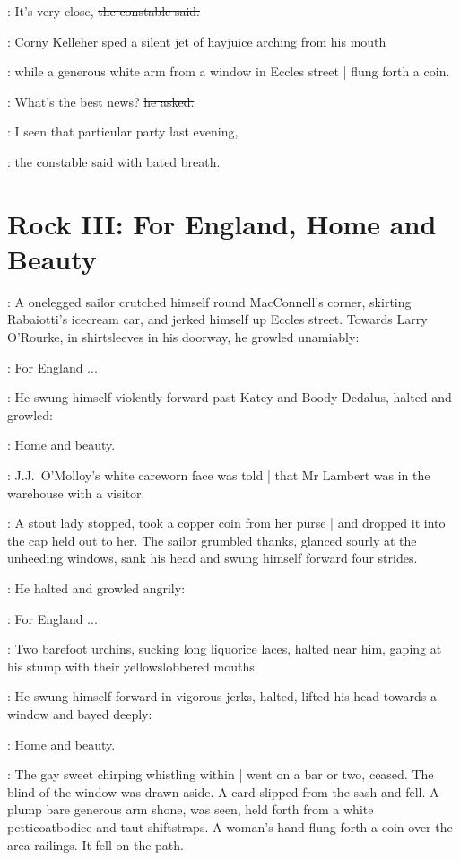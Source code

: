 \constable:
It's very close,
\sout{the constable said.}

:
Corny Kelleher sped a silent jet of hayjuice arching from his mouth

:
while a generous white arm from a window in Eccles street |
flung forth a coin.

\corny:
What's the best news? \sout{he asked.}

\constable:
I seen that particular party last evening,

:
the constable said with bated breath.


\section*{Rock III: For England, Home and Beauty}

:
A onelegged sailor crutched himself round MacConnell's corner,
skirting Rabaiotti's icecream car,
and jerked himself up Eccles street.
Towards Larry O'Rourke,
in shirtsleeves in his doorway,
he growled unamiably:

\sailor:
For England ...

:
He swung himself violently forward past Katey and Boody Dedalus,
halted and growled:

\sailor:
Home and beauty.

:
J.J.~O'Molloy's white careworn face was told |
that Mr Lambert was in the warehouse with a visitor.

:
A stout lady stopped,
took a copper coin from her purse |
and dropped it into the cap held out to her.
The sailor grumbled thanks,
glanced sourly at the unheeding windows,
sank his head
and swung himself forward four strides.

:
He halted and growled angrily:

\sailor:
For England ...

:
Two barefoot urchins,
sucking long liquorice laces,
halted near him,
gaping at his stump with their yellowslobbered mouths.

:
He swung himself forward in vigorous jerks,
halted,
lifted his head towards a window
and bayed deeply:

\sailor:
Home and beauty.

:
The gay sweet chirping whistling within |
went on a bar or two, ceased.
The blind of the window was drawn aside.
A card 
slipped from the sash and fell.
A plump bare generous arm shone,
was seen,
held forth from a white petticoatbodice and taut shiftstraps.
A woman's hand flung forth a coin
over the area railings.
It fell on the path.

